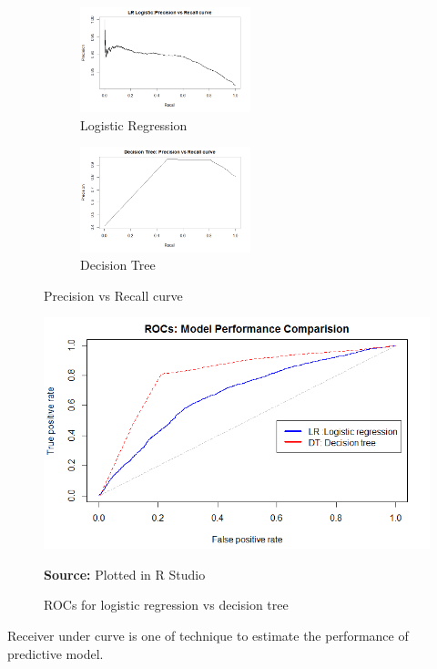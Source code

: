 \begin{figure}[t!]
    \centering
    \begin{subfigure}
        \centering
        \includegraphics[height=1.2in]{LRrecall.png}
        \caption{Logistic Regression}
    \end{subfigure}%
    \begin{subfigure}
        \centering
        \includegraphics[height=1.2in]{DRrecall.png}
        \caption{Decision Tree}
    \end{subfigure}
    \caption{Precision vs Recall curve}
\end{figure}


\begin{center}
\begin{figure}[!htb]
\includegraphics[width=\textwidth]{results1.png}
\centering
\caption{ROCs for logistic regression vs decision tree}{\textbf{Source:} Plotted in R Studio}
\label{fig:result}
\end{figure}
\end{center}

Receiver under curve is one of technique to estimate the performance of predictive model.



